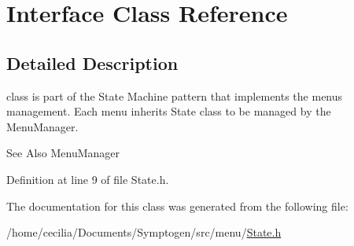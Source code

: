 \hypertarget{class_interface}{\section{Interface Class Reference}
\label{class_interface}
}


\subsection{Detailed Description}
class is part of the State Machine pattern that implements the menus management. Each menu inherits State class to be managed by the Menu\-Manager. \begin{DoxySeeAlso}{See Also}
Menu\-Manager 
\end{DoxySeeAlso}


Definition at line 9 of file State.\-h.



The documentation for this class was generated from the following file\-:\begin{DoxyCompactItemize}
\item 
/home/cecilia/\-Documents/\-Symptogen/src/menu/\hyperlink{_state_8h}{State.\-h}\end{DoxyCompactItemize}
